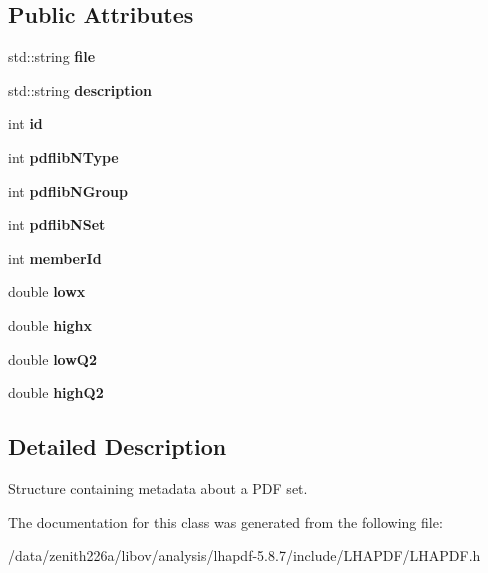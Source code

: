 \subsection*{Public Attributes}
\begin{CompactItemize}
\item 
std::string \textbf{file}\label{classLHAPDF_1_1PDFSetInfo_ac962eb2e5b4691e291b6f325ba7bcce}

\item 
std::string \textbf{description}\label{classLHAPDF_1_1PDFSetInfo_b3dd720d2a24a6c175b48501b7fae2cf}

\item 
int \textbf{id}\label{classLHAPDF_1_1PDFSetInfo_61d25c7ee6738960d35d3ce47ba7c0ed}

\item 
int \textbf{pdflib\-NType}\label{classLHAPDF_1_1PDFSetInfo_141325e4fe9167eee317ba292aaed716}

\item 
int \textbf{pdflib\-NGroup}\label{classLHAPDF_1_1PDFSetInfo_6f68b03401f6e36a5f4057bcc513f931}

\item 
int \textbf{pdflib\-NSet}\label{classLHAPDF_1_1PDFSetInfo_c085200cde3157b4070a01ec94b7ac3f}

\item 
int \textbf{member\-Id}\label{classLHAPDF_1_1PDFSetInfo_b0cdf3ef62a2ca5a429c7afd07369ada}

\item 
double \textbf{lowx}\label{classLHAPDF_1_1PDFSetInfo_7a7b5153e280c290af0f77c37b12e2af}

\item 
double \textbf{highx}\label{classLHAPDF_1_1PDFSetInfo_a5271aeb4100550171dc95bd75bd93c1}

\item 
double \textbf{low\-Q2}\label{classLHAPDF_1_1PDFSetInfo_e8f1cba5caeb50e84688a6087612ce31}

\item 
double \textbf{high\-Q2}\label{classLHAPDF_1_1PDFSetInfo_bbf8a1a1003243affed6d7e24007f5d6}

\end{CompactItemize}


\subsection{Detailed Description}
Structure containing metadata about a PDF set. 



The documentation for this class was generated from the following file:\begin{CompactItemize}
\item 
/data/zenith226a/libov/analysis/lhapdf-5.8.7/include/LHAPDF/LHAPDF.h\end{CompactItemize}
